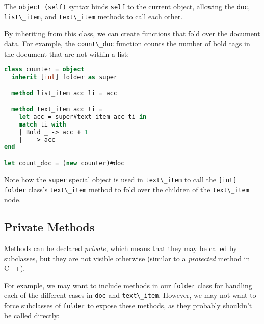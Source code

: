 The \passthrough{\lstinline!object (self)!} syntax binds
\passthrough{\lstinline!self!} to the current object, allowing the
\passthrough{\lstinline!doc!}, \passthrough{\lstinline!list\_item!}, and
\passthrough{\lstinline!text\_item!} methods to call each other.

By inheriting from this class, we can create functions that fold over
the document data. For example, the \passthrough{\lstinline!count\_doc!}
function counts the number of bold tags in the document that are not
within a list:

\begin{lstlisting}[language=Caml]
class counter = object
  inherit [int] folder as super

  method list_item acc li = acc

  method text_item acc ti =
    let acc = super#text_item acc ti in
    match ti with
    | Bold _ -> acc + 1
    | _ -> acc
end

let count_doc = (new counter)#doc
\end{lstlisting}

Note how the \passthrough{\lstinline!super!} special object is used in
\passthrough{\lstinline!text\_item!} to call the
\passthrough{\lstinline![int] folder!} class's
\passthrough{\lstinline!text\_item!} method to fold over the children of
the \passthrough{\lstinline!text\_item!} node.

\hypertarget{private-methods}{%
\subsection{Private Methods}\label{private-methods}}

Methods can be declared \emph{private}, which means that they may be
called by subclasses, but they are not visible otherwise (similar to a
\emph{protected} method in C++).

For example, we may want to include methods in our
\passthrough{\lstinline!folder!} class for handling each of the
different cases in \passthrough{\lstinline!doc!} and
\passthrough{\lstinline!text\_item!}. However, we may not want to force
subclasses of \passthrough{\lstinline!folder!} to expose these methods,
as they probably shouldn't be called directly:

